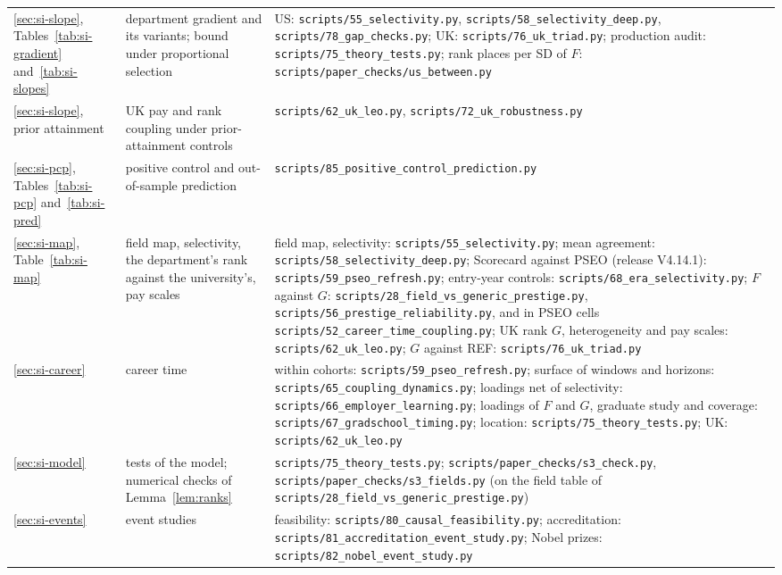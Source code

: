 \documentclass[11pt]{article}
\begin{document}
\begin{longtable}{@{}>{\raggedright\arraybackslash}p{2.7cm}>{\raggedright\arraybackslash}p{4.3cm}>{\raggedright\arraybackslash}p{8.8cm}@{}}
\ref{sec:si-slope}, Tables~\ref{tab:si-gradient} and~\ref{tab:si-slopes} & department gradient and its variants; bound under proportional selection & US: \nolinkurl{scripts/55_selectivity.py}, \nolinkurl{scripts/58_selectivity_deep.py}, \nolinkurl{scripts/78_gap_checks.py}; UK: \nolinkurl{scripts/76_uk_triad.py}; production audit: \nolinkurl{scripts/75_theory_tests.py}; rank places per SD of $F$: \nolinkurl{scripts/paper_checks/us_between.py} \\
\ref{sec:si-slope}, prior attainment & UK pay and rank coupling under prior-attainment controls & \nolinkurl{scripts/62_uk_leo.py}, \nolinkurl{scripts/72_uk_robustness.py} \\
\ref{sec:si-pcp}, Tables~\ref{tab:si-pcp} and~\ref{tab:si-pred} & positive control and out-of-sample prediction & \nolinkurl{scripts/85_positive_control_prediction.py} \\
\ref{sec:si-map}, Table~\ref{tab:si-map} & field map, selectivity, the department's rank against the university's, pay scales & field map, selectivity: \nolinkurl{scripts/55_selectivity.py}; mean agreement: \nolinkurl{scripts/58_selectivity_deep.py}; Scorecard against PSEO (release V4.14.1): \nolinkurl{scripts/59_pseo_refresh.py}; entry-year controls: \nolinkurl{scripts/68_era_selectivity.py}; $F$ against $G$: \nolinkurl{scripts/28_field_vs_generic_prestige.py}, \nolinkurl{scripts/56_prestige_reliability.py}, and in PSEO cells \nolinkurl{scripts/52_career_time_coupling.py}; UK rank $G$, heterogeneity and pay scales: \nolinkurl{scripts/62_uk_leo.py}; $G$ against REF: \nolinkurl{scripts/76_uk_triad.py} \\
\ref{sec:si-career} & career time & within cohorts: \nolinkurl{scripts/59_pseo_refresh.py}; surface of windows and horizons: \nolinkurl{scripts/65_coupling_dynamics.py}; loadings net of selectivity: \nolinkurl{scripts/66_employer_learning.py}; loadings of $F$ and $G$, graduate study and coverage: \nolinkurl{scripts/67_gradschool_timing.py}; location: \nolinkurl{scripts/75_theory_tests.py}; UK: \nolinkurl{scripts/62_uk_leo.py} \\
\ref{sec:si-model} & tests of the model; numerical checks of Lemma~\ref{lem:ranks} & \nolinkurl{scripts/75_theory_tests.py}; \nolinkurl{scripts/paper_checks/s3_check.py}, \nolinkurl{scripts/paper_checks/s3_fields.py} (on the field table of \nolinkurl{scripts/28_field_vs_generic_prestige.py}) \\
\ref{sec:si-events} & event studies & feasibility: \nolinkurl{scripts/80_causal_feasibility.py}; accreditation: \nolinkurl{scripts/81_accreditation_event_study.py}; Nobel prizes: \nolinkurl{scripts/82_nobel_event_study.py} \\

\end{longtable}
\end{document}

